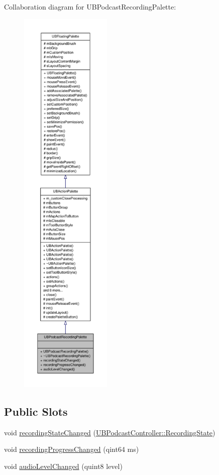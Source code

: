 Collaboration diagram for U\-B\-Podcast\-Recording\-Palette\-:
\nopagebreak
\begin{figure}[H]
\begin{center}
\leavevmode
\includegraphics[height=550pt]{d1/d0b/class_u_b_podcast_recording_palette__coll__graph}
\end{center}
\end{figure}
\subsection*{Public Slots}
\begin{DoxyCompactItemize}
\item 
void \hyperlink{class_u_b_podcast_recording_palette_a8b4955805739eb96a8b82f32f7bb76f6}{recording\-State\-Changed} (\hyperlink{class_u_b_podcast_controller_a8d0cf82737deae51ef72eaea4797c3a8}{U\-B\-Podcast\-Controller\-::\-Recording\-State})
\item 
void \hyperlink{class_u_b_podcast_recording_palette_a61987e20e6243f714fef526ee56ef3a3}{recording\-Progress\-Changed} (qint64 ms)
\item 
void \hyperlink{class_u_b_podcast_recording_palette_a1ba296c9376174b5b939951b88b7edc8}{audio\-Level\-Changed} (quint8 level)
\end{DoxyCompactItemize}
